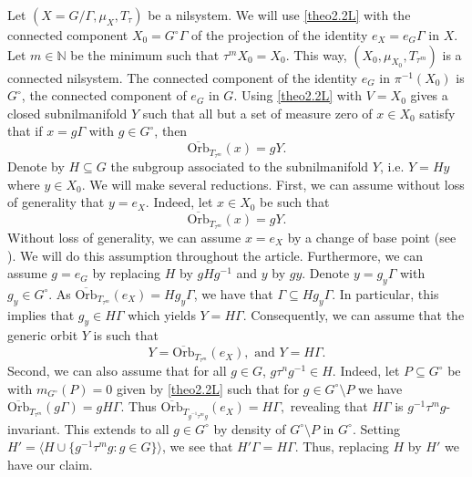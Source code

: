 \documentclass[letter, 11pt]{article}
\theoremstyle{definition}
\theoremstyle{plain}
\newcommand{\N}{\mathbb{N}}
\newcommand{\1}{\mathbbm{1}}
\begin{document}
Let $(X=G/\Gamma,\mu_X,T_\tau)$ be a nilsystem. We will use \cref{theo2.2L} with the connected component $X_0=G^{\circ}\Gamma$ of the projection of the identity $e_X=e_G\Gamma$ in $X$. Let $m\in \N$ be the minimum such that $\tau^mX_0=X_0$. This way, $(X_0,\mu_{X_0},T_{\tau^m} )$ is a connected nilsystem. The connected component of the identity $e_G$ in $\pi^{-1}(X_0)$ is $G^{\circ}$, the connected component of $e_G$ in $G$. Using \cref{theo2.2L} with $V=X_0$ gives a closed subnilmanifold $Y$ such that all but a set of measure zero of $x\in X_0$ satisfy that if $x= g\Gamma$ with $g\in G^{\circ}$, then 
$$\overline{\mathrm{Orb}}_{T_{\tau^m}}(x)=gY. $$
Denote by $H\subseteq G$ the subgroup associated to the subnilmanifold $Y$, i.e. $Y=Hy$ where $y\in X_0$. We will make several reductions. First, we can assume without loss of generality that $y=e_X$. Indeed, let $x\in X_0$ be such that 
$$\overline{\mathrm{Orb}}_{T_{\tau^m}} (x)=gY. $$
Without loss of generality, we can assume $x=e_X$ by a change of base point (see \cite[Chapter 11, section 1.2]{Host_Kra_nilpotent_structures_ergodic_theory:2018}). We will do this assumption throughout the article. Furthermore, we can assume $g=e_G$ by replacing $H$ by $gHg^{-1}$ and $y$ by $gy$. Denote $y=g_y\Gamma$ with $g_y\in G^{\circ}$. As $ \overline{\mathrm{Orb}}_{T_{\tau^m}}(e_X)=Hg_y\Gamma$, we have that $\Gamma\subseteq Hg_y \Gamma$. In particular, this implies that $g_y\in H\Gamma$ which yields $Y=H\Gamma$. Consequently, we can assume that the generic orbit $Y$ is such that
$$Y=\overline{\mathrm{Orb}}_{T_{\tau^m}}(e_X), \text{ and }Y=H\Gamma.$$
Second, we can also assume that for all $g\in G$, $g\tau^{n}g^{-1}\in H$. Indeed, 
let $P\subseteq G^{\circ}$ be with $m_{G^\circ}(P)=0$ given by \cref{theo2.2L} such that for $g\in G^{\circ}\setminus P$ we have $\overline{\mathrm{Orb}}_{T_{\tau^m}}(g\Gamma)= gH\Gamma. $ Thus
$\overline{\mathrm{Orb}}_{T_{g^{-1}\tau^m g}}(e_X)= H\Gamma, $ revealing that $H\Gamma$ is $g^{-1}\tau^m g $-invariant. This extends to all $g\in G^\circ$ by density of $G^\circ\setminus P$ in $G^\circ$. Setting $H'=\langle H \cup \{g^{-1}\tau^{m}g: g\in G\}\rangle$, we see that $H'\Gamma=H\Gamma$. Thus, replacing $H$ by $H'$ we have our claim. 
\end{document}
